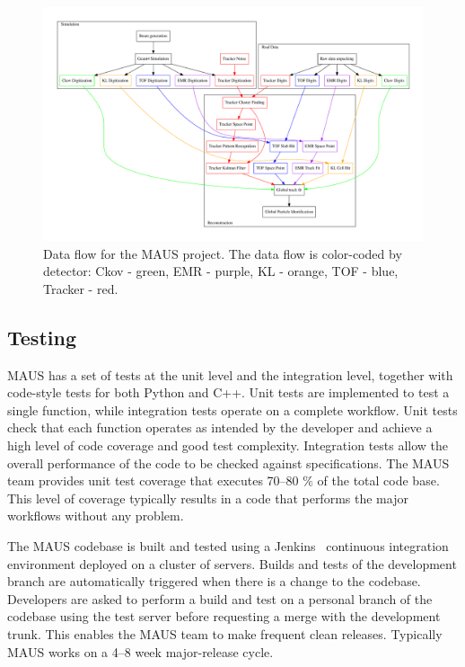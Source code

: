 \documentclass{JINST}
\begin{document}
\begin{figure}[htbp]
  \centering
  \includegraphics[width=0.9\textheight, angle=90, origin=c]{figs/maus_process_diagram.pdf}
  \caption{Data flow for the MAUS project. The data flow is color-coded by detector: Ckov - green, EMR - purple, KL - orange, TOF - blue, Tracker - red. }
  \label{fig:maus_process_diagram}
\end{figure}

\subsection{Testing}\label{sec:maus-tests}
MAUS has a set of tests at the unit level and the integration level, together with code-style tests for both Python and C++. Unit tests are implemented to test a single function, while integration tests operate on a complete workflow. Unit tests check that each function operates as intended by the developer and achieve a high level of code coverage and good test complexity. Integration tests allow the overall performance of the code to be checked against specifications. The MAUS team provides unit test coverage that executes 70--80 $\%$ of the total code base. This level of coverage typically results in a code that performs the major workflows without any problem.
%

The MAUS codebase is built and tested using a Jenkins~\cite{Jenkins} continuous integration environment deployed on a cluster of servers. Builds and tests of the development branch are automatically triggered when there is a change to the codebase.  Developers are asked to perform a build and test on a personal branch of the codebase using the test server before requesting a merge with the development trunk. This enables the MAUS team to make frequent clean releases. Typically MAUS works on a 4--8 week major-release cycle.
\end{document}
